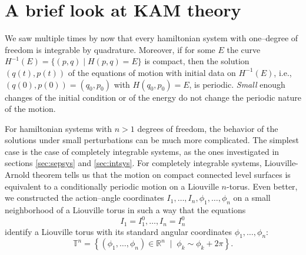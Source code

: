 \documentclass[english,fontsize=11pt,paper=b5]{scrbook}
\numberwithin{equation}{chapter}
\theoremstyle{definition}
\begin{document}




      \section{A brief look at KAM theory}

      We saw multiple times by now that every hamiltonian system with one--degree of freedom is integrable by quadrature.
      Moreover, if for some $E$ the curve $H^{-1}(E) = \{(p,q)\mid H(p,q) = E\}$ is compact, then the solution $(q(t),p(t))$ of the equations of motion with initial data on $H^{-1}(E)$, i.e., $(q(0), p(0)) = (q_0, p_0)$ with $H(q_0,p_0)=E$, is periodic. \emph{Small} enough changes of the initial condition or of the energy do not change the periodic nature of the motion.

      For hamiltonian systems with $n>1$ degrees of freedom, the behavior of the solutions under small perturbations can be much more complicated.
      The simplest case is the case of completely integrable systems, as the ones investigated in sections \ref{sec:sepsys} and \ref{sec:intsys}.
      For completely integrable systems, Liouville-Arnold theorem tells us that the motion on compact connected level surfaces is equivalent to a conditionally periodic motion on a Liouville $n$-torus.
      Even better, we constructed the action--angle coordinates $I_1, \ldots, I_n, \phi_1, \ldots, \phi_n$ on a small neighborhood of a Liouville torus in such a way that the equations
      \begin{equation}
        I_1 = I_1^0, \ldots, I_n = I_n^0
      \end{equation}
      identify a Liouville torus with its standard angular coordinates $\phi_1, \ldots, \phi_n$:
      \begin{equation}
        \mathbb{T}^n = \left\{(\phi_1, \ldots, \phi_n)\in\mathbb{R}^n \;\mid\; \phi_k\sim \phi_k + 2\pi\right\}.
      \end{equation}
\end{document}
